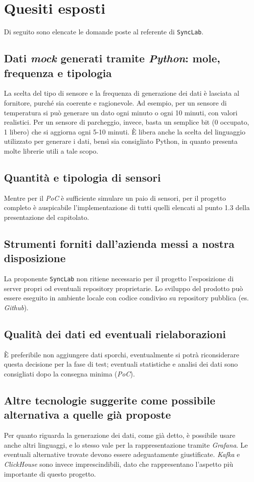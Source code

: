 \section{Quesiti esposti}
Di seguito sono elencate le domande poste al referente di \texttt{SyncLab}.

\subsection{Dati \textit{mock} generati tramite \textit{Python}: mole, frequenza e tipologia}
La scelta del tipo di sensore e la frequenza di generazione dei dati è lasciata al fornitore, purché sia coerente e ragionevole. Ad esempio, per un sensore di temperatura si può generare un dato ogni minuto o ogni 10 minuti, con valori realistici. Per un sensore di parcheggio, invece, basta un semplice bit (0 occupato, 1 libero) che si aggiorna ogni 5-10 minuti. È libera anche la scelta del linguaggio utilizzato per generare i dati, bensì sia consigliato Python, in quanto presenta molte librerie utili a tale scopo.

\subsection{Quantità e tipologia di sensori}
Mentre per il \textit{PoC} è sufficiente simulare un paio di sensori, per il progetto completo è auspicabile l'implementazione di tutti quelli elencati al punto 1.3 della presentazione del capitolato.

\subsection{Strumenti forniti dall'azienda messi a nostra disposizione}
La proponente \texttt{SyncLab} non ritiene necessario per il progetto l'esposizione di server propri od eventuali repository proprietarie. Lo sviluppo del prodotto può essere eseguito in ambiente locale con codice condiviso su repository pubblica (es. \textit{Github}).

\subsection{Qualità dei dati ed eventuali rielaborazioni}
È preferibile non aggiungere dati sporchi, eventualmente si potrà riconsiderare questa decisione per la fase di test; eventuali statistiche e analisi dei dati sono consigliati dopo la consegna minima (\textit{PoC}).

\subsection{Altre tecnologie suggerite come possibile alternativa a quelle già proposte}
Per quanto riguarda la generazione dei dati, come già detto, è possibile usare anche altri linguaggi, e lo stesso vale per la rappresentazione tramite \textit{Grafana}. Le eventuali alternative trovate devono essere adeguatamente giustificate. \textit{Kafka} e \textit{ClickHouse} sono invece imprescindibili, dato che rappresentano l'aspetto più importante di questo progetto.

